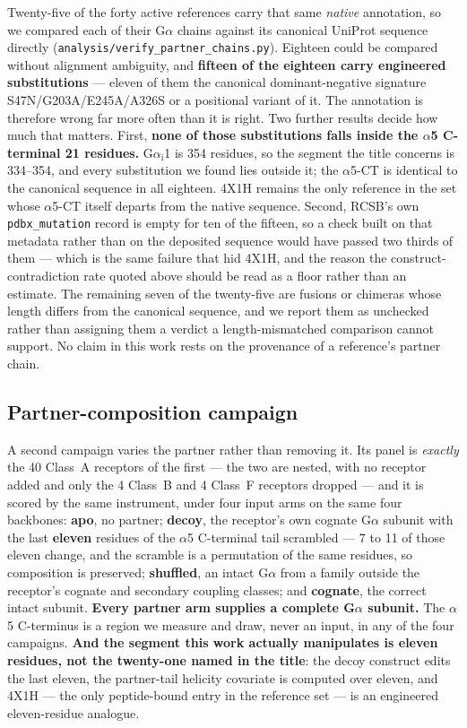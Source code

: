 Twenty-five of the forty active references carry that same \emph{native}
annotation, so we compared each of their G$\alpha$ chains against its canonical
UniProt sequence directly
(\texttt{analysis/verify\_partner\_chains.py}). Eighteen could be compared
without alignment ambiguity, and \textbf{fifteen of the eighteen carry
engineered substitutions} --- eleven of them the canonical dominant-negative
signature S47N/G203A/E245A/A326S or a positional variant of it. The annotation
is therefore wrong far more often than it is right. Two further results decide
how much that matters. First, \textbf{none of those substitutions falls inside
the $\alpha$5 C-terminal 21 residues.} G$\alpha_{\mathrm{i}}$1 is 354 residues,
so the segment the title concerns is 334--354, and every substitution we found
lies outside it; the $\alpha$5-CT is identical to the canonical sequence in all
eighteen. 4X1H remains the only reference in the set whose $\alpha$5-CT itself
departs from the native sequence. Second, RCSB's own \texttt{pdbx\_mutation}
record is empty for ten of the fifteen, so a check built on that metadata rather
than on the deposited sequence would have passed two thirds of them --- which is
the same failure that hid 4X1H, and the reason the construct-contradiction rate
quoted above should be read as a floor rather than an estimate. The remaining
seven of the twenty-five are fusions or chimeras whose length differs from the
canonical sequence, and we report them as unchecked rather than assigning them a
verdict a length-mismatched comparison cannot support. No claim in this work
rests on the provenance of a reference's partner chain.

\subsection*{Partner-composition campaign}

A second campaign varies the partner rather than removing it. Its panel is
\emph{exactly} the 40 Class~A receptors of the first --- the two are nested, with
no receptor added and only the 4 Class~B and 4 Class~F receptors dropped --- and
it is scored by the same instrument, under four input arms on the same four
backbones: \textbf{apo}, no partner; \textbf{decoy}, the receptor's own cognate
G$\alpha$ subunit with the last \textbf{eleven} residues of the $\alpha$5
C-terminal tail scrambled --- 7 to 11 of those eleven change, and the scramble is
a permutation of the same residues, so composition is preserved; \textbf{shuffled}, an intact G$\alpha$ from a family outside the
receptor's cognate and secondary coupling classes; and \textbf{cognate}, the
correct intact subunit. \textbf{Every partner arm supplies a complete
G$\alpha$ subunit.} The $\alpha$5 C-terminus is a region we measure and draw,
never an input, in any of the four campaigns. \textbf{And the segment this work
actually manipulates is eleven residues, not the twenty-one named in the
title}: the decoy construct edits the last eleven, the partner-tail helicity
covariate is computed over eleven, and 4X1H --- the only peptide-bound entry in
the reference set --- is an engineered eleven-residue analogue.

